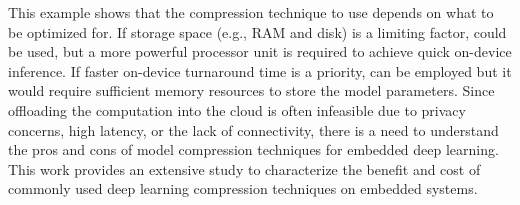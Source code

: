  This example shows that the compression technique to use depends on what to be optimized for. If storage
space (e.g., RAM and disk) is a limiting factor, \quantization could be used, but a more powerful processor unit is required to achieve
quick on-device inference. If faster on-device turnaround time is a priority, \pruning can be employed but it would require sufficient
memory resources to store the model parameters.  Since offloading the computation into the cloud is often infeasible due to privacy
concerns, high latency, or the lack of connectivity, there is a need to understand the pros and cons of model compression techniques for
embedded deep learning. This work provides an extensive study to characterize the benefit and cost of commonly used deep learning
compression techniques on embedded systems.

